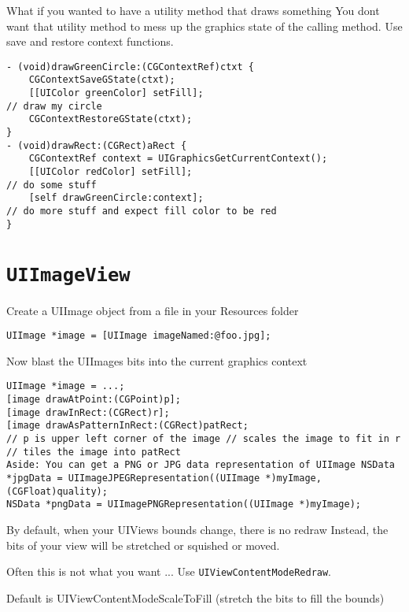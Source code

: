 \documentclass[12pt]{article}
\newcommand{\co}{\texttt}
\begin{document}
What if you wanted to have a utility method that draws something
You dont want that utility method to mess up the graphics state of the calling method. Use save and restore context functions.
\begin{lstlisting}
- (void)drawGreenCircle:(CGContextRef)ctxt {
    CGContextSaveGState(ctxt);
    [[UIColor greenColor] setFill];
// draw my circle
    CGContextRestoreGState(ctxt);
}
- (void)drawRect:(CGRect)aRect {
    CGContextRef context = UIGraphicsGetCurrentContext();
    [[UIColor redColor] setFill];
// do some stuff
    [self drawGreenCircle:context];
// do more stuff and expect fill color to be red
}
\end{lstlisting}

\section{\co{UIImageView}}
Create a UIImage object from a file in your Resources folder
\begin{lstlisting}
UIImage *image = [UIImage imageNamed:@foo.jpg]; 
\end{lstlisting}

Now blast the UIImages bits into the current graphics context
\begin{lstlisting}
UIImage *image = ...;
[image drawAtPoint:(CGPoint)p];
[image drawInRect:(CGRect)r];
[image drawAsPatternInRect:(CGRect)patRect;
// p is upper left corner of the image // scales the image to fit in r
// tiles the image into patRect
Aside: You can get a PNG or JPG data representation of UIImage NSData *jpgData = UIImageJPEGRepresentation((UIImage *)myImage, (CGFloat)quality);
NSData *pngData = UIImagePNGRepresentation((UIImage *)myImage);
\end{lstlisting}

By default, when your UIViews bounds change, there is no redraw Instead, the bits of your view will be stretched or squished or moved.

Often this is not what you want ... Use \co{UIViewContentModeRedraw}.

Default is UIViewContentModeScaleToFill (stretch the bits to fill the bounds)
\end{document}
